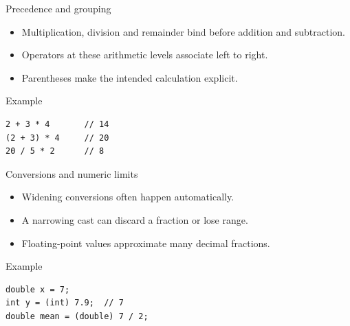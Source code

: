 \documentclass[10pt,aspectratio=169]{beamer}
\begin{document}
\begin{frame}[fragile,t]{Precedence and grouping}
\begin{itemize}
\item Multiplication, division and remainder bind before addition and subtraction.
\item Operators at these arithmetic levels associate left to right.
\item Parentheses make the intended calculation explicit.
\end{itemize}
\vspace{1mm}\begin{block}{Example}
\begin{lstlisting}
2 + 3 * 4       // 14
(2 + 3) * 4     // 20
20 / 5 * 2      // 8
\end{lstlisting}
\end{block}
\end{frame}

\begin{frame}[fragile,t]{Conversions and numeric limits}
\begin{itemize}
\item Widening conversions often happen automatically.
\item A narrowing cast can discard a fraction or lose range.
\item Floating-point values approximate many decimal fractions.
\end{itemize}
\vspace{1mm}\begin{block}{Example}
\begin{lstlisting}
double x = 7;
int y = (int) 7.9;  // 7
double mean = (double) 7 / 2;
\end{lstlisting}
\end{block}
\end{frame}
\end{document}
